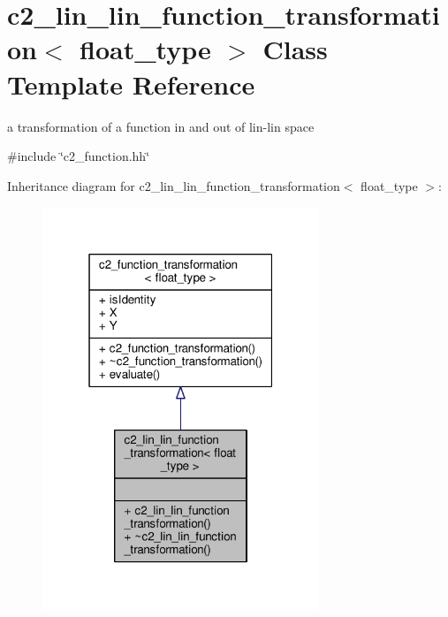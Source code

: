 \hypertarget{classc2__lin__lin__function__transformation}{}\section{c2\+\_\+lin\+\_\+lin\+\_\+function\+\_\+transformation$<$ float\+\_\+type $>$ Class Template Reference}
\label{classc2__lin__lin__function__transformation}


a transformation of a function in and out of lin-\/lin space  




{\ttfamily \#include \char`\"{}c2\+\_\+function.\+hh\char`\"{}}



Inheritance diagram for c2\+\_\+lin\+\_\+lin\+\_\+function\+\_\+transformation$<$ float\+\_\+type $>$\+:
\nopagebreak
\begin{figure}[H]
\begin{center}
\leavevmode
\includegraphics[width=235pt]{classc2__lin__lin__function__transformation__inherit__graph}
\end{center}
\end{figure}


